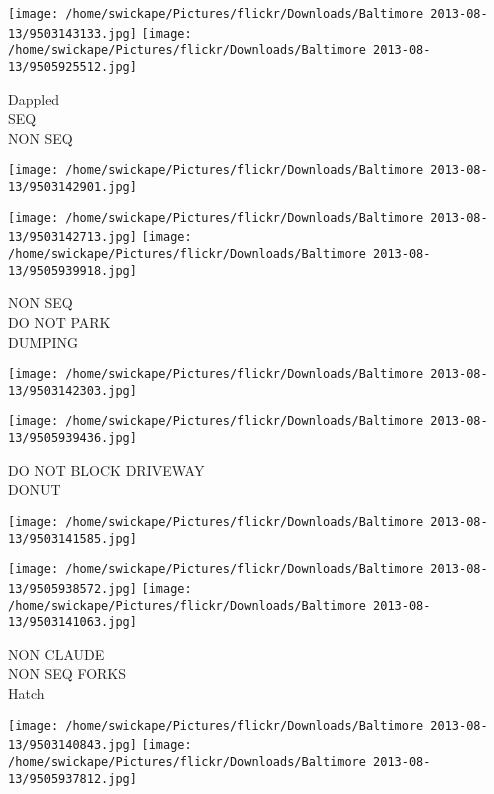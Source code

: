\documentclass[10pt,letterpaper]{article}
\begin{document}
\vspace{0.25in}
\texttt{[image: /home/swickape/Pictures/flickr/Downloads/Baltimore 2013-08-13/9503143133.jpg]}
\texttt{[image: /home/swickape/Pictures/flickr/Downloads/Baltimore 2013-08-13/9505925512.jpg]}

Dappled\\
SEQ\\
NON SEQ\\
\pagebreak

\texttt{[image: /home/swickape/Pictures/flickr/Downloads/Baltimore 2013-08-13/9503142901.jpg]}

\vspace{0.25in}
\texttt{[image: /home/swickape/Pictures/flickr/Downloads/Baltimore 2013-08-13/9503142713.jpg]}
\texttt{[image: /home/swickape/Pictures/flickr/Downloads/Baltimore 2013-08-13/9505939918.jpg]}

NON SEQ\\
DO NOT PARK\\
DUMPING\\
\pagebreak

\texttt{[image: /home/swickape/Pictures/flickr/Downloads/Baltimore 2013-08-13/9503142303.jpg]}

\vspace{0.25in}
\texttt{[image: /home/swickape/Pictures/flickr/Downloads/Baltimore 2013-08-13/9505939436.jpg]}

DO NOT BLOCK DRIVEWAY\\
DONUT\\
\pagebreak

\texttt{[image: /home/swickape/Pictures/flickr/Downloads/Baltimore 2013-08-13/9503141585.jpg]}

\vspace{0.25in}
\texttt{[image: /home/swickape/Pictures/flickr/Downloads/Baltimore 2013-08-13/9505938572.jpg]}
\texttt{[image: /home/swickape/Pictures/flickr/Downloads/Baltimore 2013-08-13/9503141063.jpg]}

NON CLAUDE\\
NON SEQ FORKS\\
Hatch\\
\pagebreak

\texttt{[image: /home/swickape/Pictures/flickr/Downloads/Baltimore 2013-08-13/9503140843.jpg]}
\texttt{[image: /home/swickape/Pictures/flickr/Downloads/Baltimore 2013-08-13/9505937812.jpg]}
\end{document}

